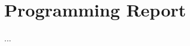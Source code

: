\documentclass[11pt]{article}
\begin{document}

\section{Programming Report}
...

%
%
\end{document}
